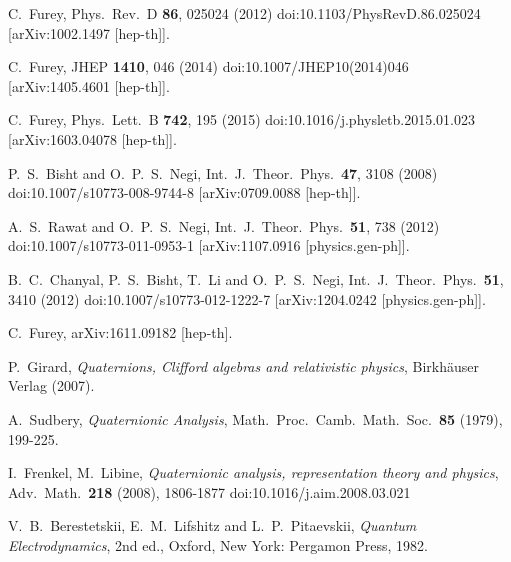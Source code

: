 \documentclass[epsfig,12pt]{article}
\begin{document}
\begin{thebibliography}{99}
  C.~Furey,
  Phys.\ Rev.\ D {\bf 86}, 025024 (2012)
  doi:10.1103/PhysRevD.86.025024
  [arXiv:1002.1497 [hep-th]].

  C.~Furey,
  JHEP {\bf 1410}, 046 (2014)
  doi:10.1007/JHEP10(2014)046
  [arXiv:1405.4601 [hep-th]].

  C.~Furey,
  Phys.\ Lett.\ B {\bf 742}, 195 (2015)
  doi:10.1016/j.physletb.2015.01.023
  [arXiv:1603.04078 [hep-th]].

  P.~S.~Bisht and O.~P.~S.~Negi,
  Int.\ J.\ Theor.\ Phys.\  {\bf 47}, 3108 (2008)
  doi:10.1007/s10773-008-9744-8
  [arXiv:0709.0088 [hep-th]].

  A.~S.~Rawat and O.~P.~S.~Negi,
  Int.\ J.\ Theor.\ Phys.\  {\bf 51}, 738 (2012)
  doi:10.1007/s10773-011-0953-1
  [arXiv:1107.0916 [physics.gen-ph]].

  B.~C.~Chanyal, P.~S.~Bisht, T.~Li and O.~P.~S.~Negi,
  Int.\ J.\ Theor.\ Phys.\  {\bf 51}, 3410 (2012)
  doi:10.1007/s10773-012-1222-7
  [arXiv:1204.0242 [physics.gen-ph]].

  C.~Furey,
  arXiv:1611.09182 [hep-th].

  P.~Girard,
  {\it Quaternions, Clifford algebras and relativistic physics},
  Birkh\"auser Verlag (2007).

  A.~Sudbery,
  {\it Quaternionic Analysis},
  Math.\ Proc.\ Camb.\ Math.\ Soc.\  {\bf 85} (1979), 199-225.

  I.~Frenkel, M.~Libine,
  {\it Quaternionic analysis, representation theory and physics},
  Adv.\ Math.\  {\bf 218} (2008), 1806-1877
  doi:10.1016/j.aim.2008.03.021

  V.~B.~Berestetskii, E.~M.~Lifshitz and L.~P.~Pitaevskii,
  {\it Quantum Electrodynamics},
  2nd ed.,
  Oxford, New York: Pergamon Press, 1982.
\end{thebibliography}
\end{document}
